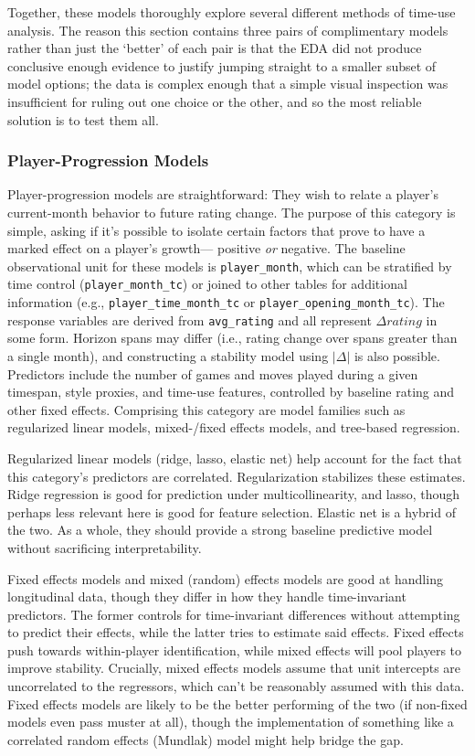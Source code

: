 \documentclass[
  12pt]{article}
\begin{document}
Together, these models thoroughly explore several different methods of
time-use analysis. The reason this section contains three pairs of
complimentary models rather than just the `better' of each pair is that
the EDA did not produce conclusive enough evidence to justify jumping
straight to a smaller subset of model options; the data is complex
enough that a simple visual inspection was insufficient for ruling out
one choice or the other, and so the most reliable solution is to test
them all.

\subsubsection{Player-Progression
Models}\label{player-progression-models}

Player-progression models are straightforward: They wish to relate a
player's current-month behavior to future rating change. The purpose of
this category is simple, asking if it's possible to isolate certain
factors that prove to have a marked effect on a player's growth---
positive \emph{or} negative. The baseline observational unit for these
models is \texttt{player\_month}, which can be stratified by time
control (\texttt{player\_month\_tc}) or joined to other tables for
additional information (e.g., \texttt{player\_time\_month\_tc} or
\texttt{player\_opening\_month\_tc}). The response variables are derived
from \texttt{avg\_rating} and all represent \(\Delta rating\) in some
form. Horizon spans may differ (i.e., rating change over spans greater
than a single month), and constructing a stability model using
\(|\Delta|\) is also possible. Predictors include the number of games
and moves played during a given timespan, style proxies, and time-use
features, controlled by baseline rating and other fixed effects.
Comprising this category are model families such as regularized linear
models, mixed-/fixed effects models, and tree-based regression.

Regularized linear models (ridge, lasso, elastic net) help account for
the fact that this category's predictors are correlated. Regularization
stabilizes these estimates. Ridge regression is good for prediction
under multicollinearity, and lasso, though perhaps less relevant here is
good for feature selection. Elastic net is a hybrid of the two. As a
whole, they should provide a strong baseline predictive model without
sacrificing interpretability.

Fixed effects models and mixed (random) effects models are good at
handling longitudinal data, though they differ in how they handle
time-invariant predictors. The former controls for time-invariant
differences without attempting to predict their effects, while the
latter tries to estimate said effects. Fixed effects push towards
within-player identification, while mixed effects will pool players to
improve stability. Crucially, mixed effects models assume that unit
intercepts are uncorrelated to the regressors, which can't be reasonably
assumed with this data. Fixed effects models are likely to be the better
performing of the two (if non-fixed models even pass muster at all),
though the implementation of something like a correlated random effects
(Mundlak) model might help bridge the gap.
\end{document}
